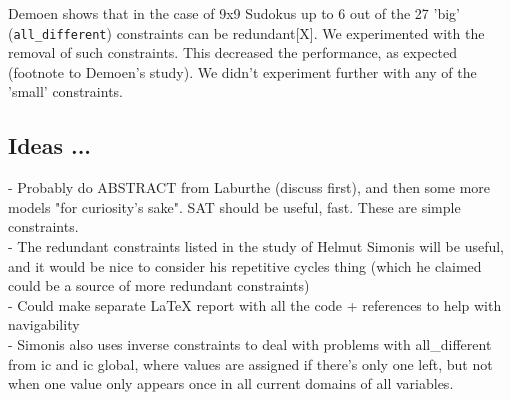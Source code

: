 \documentclass{misc/theme}
\begin{document}
Demoen shows that in the case of 9x9 Sudokus up to 6 out of the 27 'big' (\texttt{all\_different}) constraints can be redundant[X]. We experimented with the removal of such constraints. This decreased the performance, as expected (footnote to Demoen's study). We didn't experiment further with any of the 'small' constraints.

\subsection{Ideas ...}

 - Probably do ABSTRACT from Laburthe (discuss first), and then some more models "for curiosity's sake". SAT should be useful, fast. These are simple constraints.\\
 - The redundant constraints listed in the study of Helmut Simonis will be useful, and it would be nice to consider his repetitive cycles thing (which he claimed could be a source of more redundant constraints)\\
 - Could make separate LaTeX report with all the code + references to help with navigability\\
 - Simonis also uses inverse constraints to deal with problems with all\_different from ic and ic global, where values are assigned if there's only one left, but not when one value only appears once in all current domains of all variables.
\end{document}
